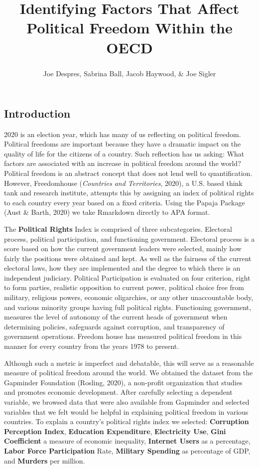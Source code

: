 \documentclass[
  english,
  man,floatsintext]{apa6}
\title{Identifying Factors That Affect Political Freedom Within the OECD}
\author{Joe Despres\textsuperscript{}, Sabrina Ball\textsuperscript{}, Jacob Haywood\textsuperscript{}, \& Joe Sigler\textsuperscript{}}
\date{}
\affiliation{\vspace{0.5cm}\textsuperscript{} Michigan State University\\
November 30, 2020}
\begin{document}
\maketitle

\hypertarget{introduction}{%
\subsection{Introduction}\label{introduction}}

2020 is an election year, which has many of us reflecting on political freedom. Political freedoms are important because they have a dramatic impact on the quality of life for the citizens of a country. Such reflection has us asking: What factors are associated with an increase in political freedom around the world? Political freedom is an abstract concept that does not lend well to quantification. However, Freedomhouse (\emph{Countries and Territories}, 2020), a U.S. based think tank and research institute, attempts this by assigning an index of political rights to each country every year based on a fixed criteria. Using the Papaja Package (Aust \& Barth, 2020) we take Rmarkdown directly to APA format.

The \textbf{Political Rights} Index is comprised of three subcategories. Electoral process, political participation, and functioning government. Electoral process is a score based on how the current government leaders were selected, mainly how fairly the positions were obtained and kept. As well as the fairness of the current electoral laws, how they are implemented and the degree to which there is an independent judiciary. Political Participation is evaluated on four criterion, right to form parties, realistic opposition to current power, political choice free from military, religious powers, economic oligarchies, or any other unaccountable body, and various minority groups having full political rights. Functioning government, measures the level of autonomy of the current heads of government when determining policies, safeguards against corruption, and transparency of government operations. Freedom house has measured political freedom in this manner for every country from the years 1978 to present.

Although such a metric is imperfect and debatable, this will serve as a reasonable measure of political freedom around the world. We obtained the dataset from the Gapminder Foundation (Rosling, 2020), a non-profit organization that studies and promotes economic development. After carefully selecting a dependent variable, we browsed data that were also available from Gapminder and selected variables that we felt would be helpful in explaining political freedom in various countries. To explain a country's political rights index we selected: \textbf{Corruption Perception Index}, \textbf{Education Expenditure}, \textbf{Electricity Use}, \textbf{Gini Coefficient} a measure of economic inequality, \textbf{Internet Users} as a percentage, \textbf{Labor Force Participation} Rate, \textbf{Military Spending} as percentage of GDP, and \textbf{Murders} per million.
\end{document}
